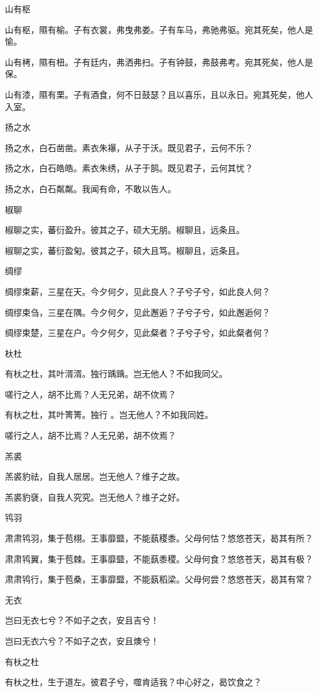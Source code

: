 山有枢

山有枢，隰有榆。子有衣裳，弗曳弗娄。子有车马，弗驰弗驱。宛其死矣，他人是愉。

山有栲，隰有杻。子有廷内，弗洒弗扫。子有钟鼓，弗鼓弗考。宛其死矣，他人是保。

山有漆，隰有栗。子有酒食，何不日鼓瑟？且以喜乐，且以永日。宛其死矣，他人入室。

扬之水

扬之水，白石凿凿。素衣朱襮，从子于沃。既见君子，云何不乐？

扬之水，白石皓皓。素衣朱绣，从子于鹄。既见君子，云何其忧？

扬之水，白石粼粼。我闻有命，不敢以告人。

椒聊

椒聊之实，蕃衍盈升。彼其之子，硕大无朋。椒聊且，远条且。

椒聊之实，蕃衍盈匊。彼其之子，硕大且笃。椒聊且，远条且。

绸缪

绸缪束薪，三星在天。今夕何夕，见此良人？子兮子兮，如此良人何？

绸缪束刍，三星在隅。今夕何夕，见此邂逅？子兮子兮，如此邂逅何？

绸缪束楚，三星在户。今夕何夕，见此粲者？子兮子兮，如此粲者何？

杕杜

有杕之杜，其叶湑湑。独行踽踽。岂无他人？不如我同父。

嗟行之人，胡不比焉？人无兄弟，胡不佽焉？

有杕之杜，其叶箐箐。独行 。岂无他人？不如我同姓。

嗟行之人，胡不比焉？人无兄弟，胡不佽焉？

羔裘

羔裘豹祛，自我人居居。岂无他人？维子之故。

羔裘豹褎，自我人究究。岂无他人？维子之好。

鸨羽

肃肃鸨羽，集于苞栩。王事靡盬，不能蓺稷黍。父母何怙？悠悠苍天，曷其有所？

肃肃鸨翼，集于苞棘。王事靡盬，不能蓺黍稷。父母何食？悠悠苍天，曷其有极？

肃肃鸨行，集于苞桑，王事靡盬，不能蓺稻梁。父母何尝？悠悠苍天，曷其有常？

无衣

岂曰无衣七兮？不如子之衣，安且吉兮！

岂曰无衣六兮？不如子之衣，安且燠兮！

有杕之杜

有杕之杜，生于道左。彼君子兮，噬肯适我？中心好之，曷饮食之？

